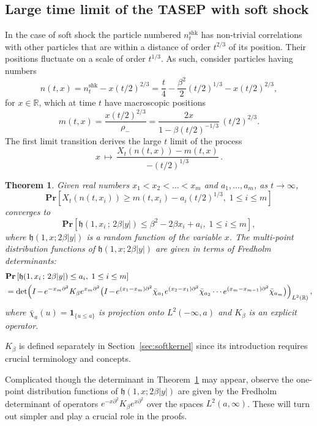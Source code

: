 \documentclass[10pt]{amsart}
\newtheorem{theo}{Theorem}[section]
\theoremstyle{definition}\newtheorem{defi}[theo]{Definition}\newtheorem{rema}[theo]{Remark}\newtheorem{exam}[theo]{Example}\newtheorem{exem}[theo]{Example}\newtheorem{nota}[theo]{Notation}
\DeclareMathOperator{\shk}{shk}
\newcommand{\pr}[1]{\mathbf{Pr}\left[#1\right]}
\newcommand{\ind}[1]{\mathbf{1}_{\{ #1 \}}}
\newcommand{\R}{\mathbb{R}}
\newcommand{\h}{\mathfrak{h}}
\newcommand*{\Mk}{\mkern -2mu}
\begin{document}
\subsection{Large time limit of the TASEP with soft shock} In the case of soft shock the particle numbered $n^{\shk}_t$ has non-trivial correlations with other particles that are within a distance of order $t^{2/3}$ of its position. Their positions fluctuate on a scale of order $t^{1/3}$. As such, consider particles having numbers
\[
n(t, x) = n^{\shk}_t - x(t/2)^{2/3} = \frac{t}{4} - \frac{\beta^2}{2}(t/2)^{1/3} - x(t/2)^{2/3},
\]
for $x \in \R$, which at time $t$ have macroscopic positions
\[
m(t,x) = \frac{x (t/2)^{2/3}}{\rho_{-}} = \frac{2x}{1-\beta(t/2)^{-1/3}}\, (t/2)^{2/3}.
\]
The first limit transition derives the large $t$ limit of the process
\begin{equation}\label{eqn:firstlim}
x \, \mapsto \, \frac{X_t(n(t,x)) - m(t,x)}{-(t/2)^{1/3}}\,.
\end{equation}


\begin{theo}\label{thm:2}
Given real numbers $x_1 < x_2 < \dots < x_m$ and $a_1, \dots, a_m$, as $ t \to \infty$,
\[
\pr{ X_t(n(t,x_i)) \geq m(t,x_i) - a_i(t/2)^{1/3},\; 1 \leq i \leq m}
\]
converges to
\[
\pr{ \h(1,x_i \,; \, 2\beta|y|) \leq \beta^2 - 2\beta x_i + a_i, \; 1 \leq i \leq m},
\]
where $\h(1,x; 2\beta|y|)$ is a random function of the variable $x$. The multi-point distribution functions of $\h(1,x; 2\beta |y|)$ are given in terms of Fredholm determinants:
\begin{align*}
& \pr{\h(1,x_i \,;\, 2\beta|y|) \leq a_i,\; 1\leq i \leq m}\\
& =\det\!\left (I \Mk-\Mk e^{-x_m \partial^2}K_{\beta}e^{x_m \partial^2}
\big (I \Mk-\Mk e^{(x_1-x_m)\partial^2}\bar{\chi}_{a_1} e^{(x_2-x_1)\partial^2} \bar{\chi}_{a_2}
\cdots e^{(x_m-x_{m-1})\partial^2}\bar{\chi}_{a_m} \big)\right)_{L^2(\R)},
\end{align*}
where $\bar{\chi}_{a}(u) = \ind{u \leq a}$ is projection onto $L^2(-\infty, a)$ and $K_{\beta}$ is an explicit operator.
\end{theo}

$K_{\beta}$ is defined separately in Section~\ref{sec:softkernel} since its introduction requires crucial terminology and concepts.

Complicated though the determinant in Theorem~\ref{thm:2} may appear, observe the one-point distribution functions of $\h(1,x; 2\beta |y|)$ are given by the Fredholm determinant of operators $e^{-x\partial^2} K_{\beta} e^{x \partial^2}$ over the spaces $L^2(a,\infty)$. These will turn out simpler and play a crucial role in the proofs.
\end{document}

